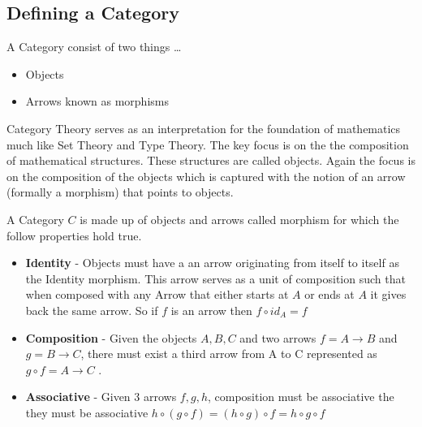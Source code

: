 \subsection{Defining a Category}

A Category consist of two things \ldots

\begin{itemize}
  \item Objects
  \item Arrows known as morphisms
\end{itemize}

Category Theory serves as an interpretation for the foundation of mathematics much like Set Theory and Type Theory. The key focus is on the the composition of mathematical structures. These structures are called objects. Again the focus is on the composition of the objects which is captured with the notion of an arrow (formally a morphism) that points to objects.

A Category $C$ is made up of objects and arrows called morphism for which the follow properties hold true.

\begin{itemize}
  \item \textbf{Identity} - Objects must have a an arrow originating from itself to itself as the Identity morphism. This arrow serves as a unit of composition such that when composed with any Arrow that either starts at $A$ or ends at $A$ it gives back the same arrow. So if $f$ is an arrow then $f \circ id_A = f$
  \item \textbf{Composition} - Given the objects $A, B, C$ and two arrows $f = A \rightarrow B$ and $g = B \rightarrow C$, there must exist a third arrow from A to C represented as $g \circ f = A \rightarrow C$ .
  \item \textbf{Associative} - Given 3 arrows $f, g, h$, composition must be associative the they must be associative $h \circ (g \circ f) = (h \circ g) \circ f = h \circ g \circ f$
\end{itemize}